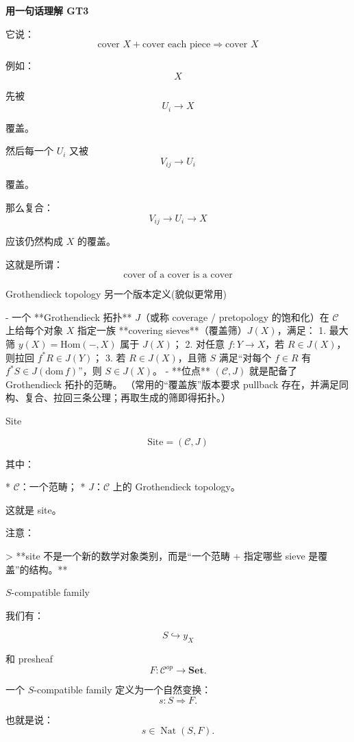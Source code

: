 \documentclass{beamer}
\begin{document}
\begin{frame}[fragile]
\begin{markdown}
\textbf{用一句话理解 GT3}

它说：
$$
\boxed{
\text{cover }X +
\text{cover each piece}
\Rightarrow
\text{cover }X
}
$$

例如：
$$
X
$$

先被
$$
U_i\to X
$$

覆盖。

然后每一个 $U_i$ 又被
$$
V_{ij}\to U_i
$$

覆盖。

那么复合：
$$
V_{ij}\to U_i\to X
$$

应该仍然构成 $X$ 的覆盖。

这就是所谓：
$$
\boxed{\text{cover of a cover is a cover}}
$$
\end{markdown}
\end{frame}

\begin{frame}[fragile]{Grothendieck topology 另一个版本定义(貌似更常用)}
\begin{markdown}
- 一个 **Grothendieck 拓扑** $J$（或称 coverage / pretopology 的饱和化）在 $\mathcal{C}$ 上给每个对象 $X$ 指定一族 **covering sieves**（覆盖筛）$J(X)$，满足：  
  1. 最大筛 $y(X)=\mathrm{Hom}(-,X)$ 属于 $J(X)$；  
  2. 对任意 $f:Y\to X$，若 $R\in J(X)$，则拉回 $f^*R\in J(Y)$；  
  3. 若 $R\in J(X)$，且筛 $S$ 满足“对每个 $f\in R$ 有 $f^*S\in J(\mathrm{dom}\,f)$”，则 $S\in J(X)$。  
- **位点** $(\mathcal{C},J)$ 就是配备了 Grothendieck 拓扑的范畴。  
（常用的“覆盖族”版本要求 pullback 存在，并满足同构、复合、拉回三条公理；再取生成的筛即得拓扑。）
\end{markdown}
\end{frame}

\begin{frame}[fragile]{Site}
\begin{markdown}
$$
\boxed{
\text{Site} =
(\mathcal C,J)
}
$$

其中：

* $\mathcal C$：一个范畴；
* $J$：$\mathcal C$ 上的 Grothendieck topology。

这就是 site。

注意：

> **site 不是一个新的数学对象类别，而是“一个范畴 + 指定哪些 sieve 是覆盖”的结构。**
\end{markdown}
\end{frame}

\begin{frame}[fragile]{$S$-compatible family}
\begin{markdown}
我们有：

$$
S\hookrightarrow y_X
$$

和 presheaf
$$
F:\mathcal C^{op}\to\mathbf{Set}.
$$

一个 $S$-compatible family 定义为一个自然变换：
$$
\boxed{
s:S\Rightarrow F.
}
$$

也就是说：
$$
s\in\operatorname{Nat}(S,F).
$$
\end{markdown}
\end{frame}
\end{document}
